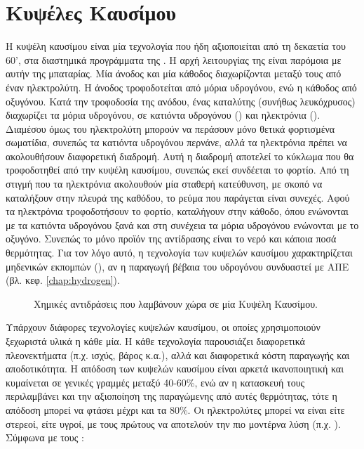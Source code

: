 \documentclass[12pt]{report}
\begin{document}
\section{Κυψέλες Καυσίμου}
Η κυψέλη καυσίμου είναι μία τεχνολογία που ήδη αξιοποιείται από τη δεκαετία του 60', στα διαστημικά προγράμματα της {}. Η αρχή λειτουργίας της είναι παρόμοια με αυτήν της μπαταρίας. Μία άνοδος και μία κάθοδος
διαχωρίζονται μεταξύ τους από έναν ηλεκτρολύτη. Η άνοδος τροφοδοτείται από μόρια υδρογόνου, ενώ η κάθοδος από οξυγόνου. Κατά την τροφοδοσία της ανόδου, ένας καταλύτης (συνήθως λευκόχρυσος) διαχωρίζει τα μόρια υδρογόνου, 
σε κατιόντα υδρογόνου ({}) και ηλεκτρόνια ({}).
Διαμέσου όμως του ηλεκτρολύτη μπορούν να περάσουν μόνο θετικά φορτισμένα σωματίδια, συνεπώς τα κατιόντα υδρογόνου περνάνε, αλλά τα ηλεκτρόνια πρέπει να ακολουθήσουν διαφορετική διαδρομή. Αυτή η διαδρομή αποτελεί
το κύκλωμα που θα τροφοδοτηθεί από την κυψέλη καυσίμου, συνεπώς εκεί συνδέεται το φορτίο. Από τη στιγμή που τα ηλεκτρόνια ακολουθούν μία σταθερή κατεύθυνση, με σκοπό να καταλήξουν στην πλευρά της καθόδου, το ρεύμα που 
παράγεται είναι συνεχές. Αφού τα ηλεκτρόνια τροφοδοτήσουν το φορτίο, καταλήγουν στην κάθοδο, όπου ενώνονται με τα κατιόντα υδρογόνου ξανά και στη συνέχεια τα μόρια υδρογόνου ενώνονται με το οξυγόνο. 
Συνεπώς το μόνο προϊόν της αντίδρασης είναι το νερό και κάποια ποσά θερμότητας. Για τον λόγο αυτό, η
τεχνολογία των κυψελών καυσίμου χαρακτηρίζεται μηδενικών εκπομπών ({}), αν η παραγωγή βέβαια του υδρογόνου συνδυαστεί με ΑΠΕ (βλ. κεφ. \ref{chap:hydrogen}).

\begin{figure}[h]
				\center
				{}
				\captionsetup{width=0.8\textwidth}
				\caption{Χημικές αντιδράσεις που λαμβάνουν χώρα σε μία Κυψέλη Καυσίμου.}
				\label{eq:fuelcell}
\end{figure}

Υπάρχουν διάφορες τεχνολογίες κυψελών καυσίμου, οι οποίες χρησιμοποιούν ξεχωριστά υλικά η κάθε μία. Η κάθε τεχνολογία παρουσιάζει διαφορετικά πλεονεκτήματα (π.χ. ισχύς, βάρος κ.α.), αλλά και διαφορετικά κόστη παραγωγής 
και αποδοτικότητα. Η απόδοση των κυψελών καυσίμου είναι αρκετά ικανοποιητική και κυμαίνεται σε γενικές γραμμές μεταξύ 40-60\%, ενώ αν η κατασκευή τους περιλαμβάνει και την αξιοποίηση της παραγώμενης από αυτές θερμότητας, τότε η 
απόδοση μπορεί να φτάσει μέχρι και τα 80\%. Οι ηλεκτρολύτες μπορεί να είναι είτε στερεοί, είτε υγροί, με τους πρώτους να αποτελούν την πιο μοντέρνα λύση (π.χ. {}). Σύμφωνα με
τους \textcite{diaz2016}:
\end{document}
